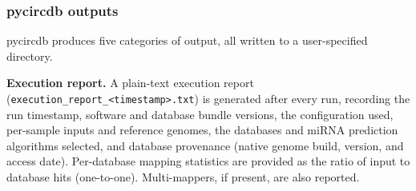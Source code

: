 \begin{table}[!ht]
\centering
\caption[pycircdb benchmarking results]{\textbf{pycircdb benchmarking results.} Inputs marked $^\dagger$ are high-confidence circRNA candidates ($\geq$3 back-splice junction reads, detected by $\geq$3 of seven quantification tools); remaining inputs are circRNAs with no filtering applied for performance scaling assessment. Annotation and FASTA columns report unique circRNAs across results (rate of annotation multi-mapping circRNAs are in superscript); miRNA and RBP report unique hg38 coordinates with miRNA/RBP interactions. Database files (3.6\,GB) were pre-cached; download time is excluded.}
\label{pycircbenchmarking}
\end{table}

\subsubsection{pycircdb outputs}
pycircdb produces five categories of output, all written to a user-specified directory.

\textbf{Execution report.}
A plain-text execution report (\texttt{execution\_report\_<timestamp>.txt}) is generated after every run, recording the run timestamp, software and database bundle versions, the configuration used, per-sample inputs and reference genomes, the databases and miRNA prediction algorithms selected, and database provenance (native genome build, version, and access date). Per-database mapping statistics are provided as the ratio of input to database hits (one-to-one). Multi-mappers, if present, are also reported.

